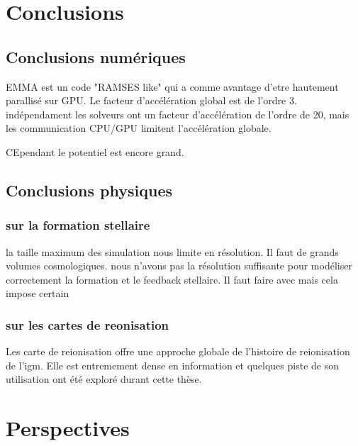 \chapter{Conclusions}

\section{Conclusions numériques}

EMMA est un code "RAMSES like" qui a comme avantage d'etre hautement parallisé sur GPU.
Le facteur d'accélération global est de l'ordre 3.
indépendament les solveurs ont un facteur d'accélération de l'ordre de 20, mais les communication CPU/GPU limitent l'accélération globale.

CEpendant le potentiel est encore grand.


\section{Conclusions physiques}

\subsection{sur la formation stellaire}
la taille maximum des simulation nous limite en résolution.
Il faut de grands volumes cosmologiques.
nous n'avons pas la résolution suffisante pour modéliser correctement la formation et le feedback stellaire.
Il faut faire avec mais cela impose certain 

\subsection{sur les cartes de reonisation}
Les carte de reionisation offre une approche globale de l'histoire de reionisation de l'igm.
Elle est entremement dense en information et quelques piste de son utilisation ont été exploré durant cette thèse.




\chapter{Perspectives}

